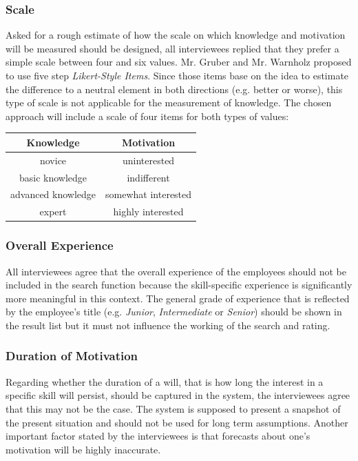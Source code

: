 \newpage

\subsubsection{Scale}
\label{scale_definition}
Asked for a rough estimate of how the scale on which knowledge and motivation will be measured should be designed, all interviewees replied that they prefer a simple scale between four and six values. Mr. Gruber and Mr. Warnholz proposed to use five step \textit{Likert-Style Items}. Since those items base on the idea to estimate the difference to a neutral element in both directions (e.g. better or worse), this type of scale is not applicable for the measurement of knowledge. The chosen approach will include a scale of four items for both types of values:
\begin{center}
\begin{tabular}{c|c}
	Knowledge & Motivation \\
	\hline
	novice & uninterested\\
	basic knowledge & indifferent\\
	advanced knowledge & somewhat interested\\
	expert & highly interested\\
\end{tabular}
\end{center}


\subsubsection{Overall Experience}
All interviewees agree that the overall experience of the employees should not be included in the search function because the skill-specific experience is significantly more meaningful in this context. The general grade of experience that is reflected by the employee's title (e.g. \textit{Junior}, \textit{Intermediate} or \textit{Senior}) should be shown in the result list but it must not influence the working of the search and rating.

\subsubsection{Duration of Motivation}
Regarding whether the duration of a will, that is how long the interest in a specific skill will persist, should be captured in the system, the interviewees agree that this may not be the case. The system is supposed to present a snapshot of the present situation and should not be used for long term assumptions. Another important factor stated by the interviewees is that forecasts about one's motivation will be highly inaccurate.

